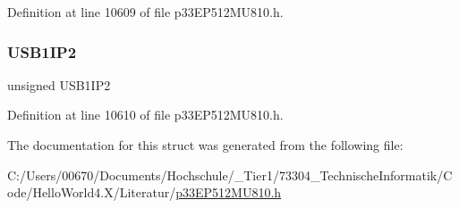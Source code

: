 Definition at line 10609 of file p33\+E\+P512\+M\+U810.\+h.

\mbox{\label{structtag_i_p_c21_b_i_t_s_aa8c9797d7c9d7e595ecfff84dc8dae35}} 
\subsubsection{\texorpdfstring{U\+S\+B1\+I\+P2}{USB1IP2}}
{\footnotesize\ttfamily unsigned U\+S\+B1\+I\+P2}



Definition at line 10610 of file p33\+E\+P512\+M\+U810.\+h.



The documentation for this struct was generated from the following file\+:\begin{DoxyCompactItemize}
\item 
C\+:/\+Users/00670/\+Documents/\+Hochschule/\+\_\+\+Tier1/73304\+\_\+\+Technische\+Informatik/\+Code/\+Hello\+World4.\+X/\+Literatur/\hyperlink{p33_e_p512_m_u810_8h}{p33\+E\+P512\+M\+U810.\+h}\end{DoxyCompactItemize}
